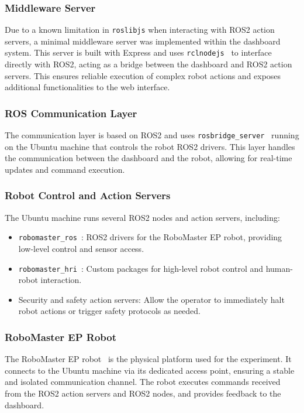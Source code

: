 \documentclass[a4paper]{usiinfbachelorproject}
\begin{document}
\subsubsection*{\textbf{Middleware Server}}
Due to a known limitation in \texttt{roslibjs} when interacting with ROS2 action servers, a minimal middleware server was implemented within the dashboard system.
This server is built with Express and uses \texttt{rclnodejs}~\cite{rclnodejs} to interface directly with ROS2, acting as a bridge between the dashboard and ROS2 action servers.
This ensures reliable execution of complex robot actions and exposes additional functionalities to the web interface.

\subsubsection*{\textbf{ROS Communication Layer}}
The communication layer is based on ROS2 and uses \texttt{rosbridge\_server}~\cite{rosbridge} running on the Ubuntu machine that controls the robot ROS2 drivers.
This layer handles the communication between the dashboard and the robot, allowing for real-time updates and command execution.

\subsubsection*{\textbf{Robot Control and Action Servers}}
The Ubuntu machine runs several ROS2 nodes and action servers, including:
\begin{itemize}
    \item \texttt{robomaster\_ros}~\cite{frovaaa2025robomaster}: ROS2 drivers for the RoboMaster EP robot, providing low-level control and sensor access.
    \item \texttt{robomaster\_hri}~\cite{frovaaa2025robomasterhri}: Custom packages for high-level robot control and human-robot interaction.
    \item Security and safety action servers: Allow the operator to immediately halt robot actions or trigger safety protocols as needed.
\end{itemize}

\subsubsection*{\textbf{RoboMaster EP Robot}}
The RoboMaster EP robot~\cite{djirobomasterep} is the physical platform used for the experiment.
It connects to the Ubuntu machine via its dedicated access point, ensuring a stable and isolated communication channel.
The robot executes commands received from the ROS2 action servers and ROS2 nodes, and provides feedback to the dashboard.
\end{document}
